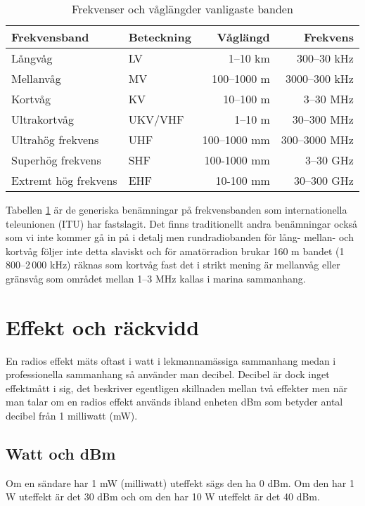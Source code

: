 \documentclass[12ypt,swedish,a4paper]{report}
\begin{document}
\begin{table}[!h]
	\begin{tabular}{llrr}
		Frekvensband         & Beteckning &     Våglängd &      Frekvens \\ \hline
		Långvåg              & LV         &     1--10 km &   300--30 kHz \\
		Mellanvåg            & MV         &  100--1000 m & 3000--300 kHz \\
		Kortvåg              & KV         &    10--100 m &     3--30 MHz \\
		Ultrakortvåg         & UKV/VHF    &      1--10 m &   30--300 MHz \\
		Ultrahög frekvens    & UHF        & 100--1000 mm & 300--3000 MHz \\
		Superhög frekvens    & SHF        &  100-1000 mm &     3--30 GHz \\
		Extremt hög frekvens & EHF        &    10-100 mm &   30--300 GHz
	\end{tabular}
	\caption{Frekvenser och våglängder vanligaste banden}
	\label{tab:frekvens-vaglangd}
\end{table}

Tabellen \ref{tab:frekvens-vaglangd} är de generiska benämningar på frekvensbanden som internationella teleunionen (ITU) har fastslagit. Det finns traditionellt andra benämningar också som vi inte kommer gå in på i detalj men rundradiobanden för lång- mellan- och kortvåg följer inte detta slaviskt och för amatörradion brukar 160 m bandet (1\,800--2\,000 kHz) räknas som kortvåg fast det i strikt mening är mellanvåg eller gränsvåg som området mellan 1--3 MHz kallas i marina sammanhang.

\section{Effekt och räckvidd}

En radios effekt mäts oftast i watt i lekmannamässiga sammanhang medan i professionella sammanhang så använder man decibel. Decibel är dock inget effektmått i sig, det beskriver egentligen skillnaden mellan två effekter men när man talar om en radios effekt används ibland enheten dBm som betyder antal decibel från 1 milliwatt (mW).

\subsection{Watt och dBm}

Om en sändare har 1 mW (milliwatt) uteffekt sägs den ha 0 dBm. Om den har 1 W uteffekt är det 30 dBm och om den har 10 W uteffekt är det 40 dBm.
\end{document}
